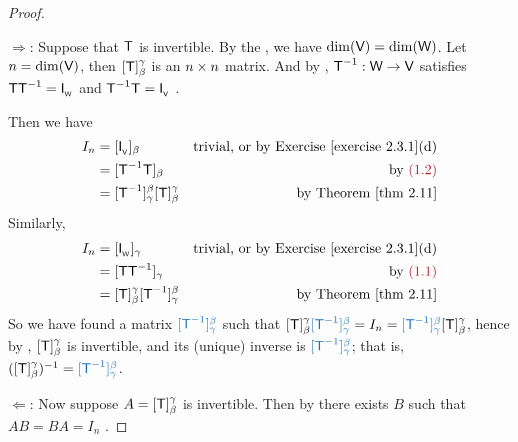 \begin{proof} \ 

\(\Longrightarrow\): Suppose that \(\textsf{T}\) is invertible.
By the , we have \(\dim(\textsf{V}) = \dim(\textsf{W})\).
Let \(n = \dim(\textsf{V})\), then \([\textsf{T}]_{\beta}^{\gamma}\) is an \(n \times n\) matrix.
And by , \(\textsf{T}^{-1} : \textsf{W} \to \textsf{V}\) satisfies \(\textsf{T}\textsf{T}^{-1} = \textsf{I}_{_{\textsf{W}}}\)  and \(\textsf{T}^{-1}\textsf{T} = \textsf{I}_{_{\textsf{V}}}\) .

Then we have
\begin{align*}
    I_n & = [\ITRANV]_{\beta} & \text{trivial, or by \EXEC{2.3.1}(d)} \\
        & = [\T^{-1}\T]_{\beta} & \text{by \MAROON{(1.2)}} \\
        & = [\T^{-1}]_{\gamma}^{\beta} [\T]_{\beta}^{\gamma} & \text{by \THM{2.11}}
\end{align*}
Similarly,
\begin{align*}
    I_n & = [\ITRANW]_{\gamma} & \text{trivial, or by \EXEC{2.3.1}(d)} \\
        & = [\T\T^{-1}]_{\gamma} & \text{by \MAROON{(1.1)}} \\
        & = [\T]_{\beta}^{\gamma} [\T^{-1}]_{\gamma}^{\beta} & \text{by \THM{2.11}}
\end{align*}
So we have found a matrix \( \BLUE{[\T^{-1}]_{\gamma}^{\beta}}\) such that \([\T]_{\beta}^{\gamma} \BLUE{[\T^{-1}]_{\gamma}^{\beta}} = I_n = \BLUE{[\T^{-1}]_{\gamma}^{\beta}} [\T]_{\beta}^{\gamma}\),
hence by , \([\textsf{T}]_{\beta}^{\gamma}\) is invertible, and its (unique) inverse is \(\BLUE{[\T^{-1}]_{\gamma}^{\beta}}\);
that is, \(([\T]_{\beta}^{\gamma})^{-1} = \BLUE{[\T^{-1}]_{\gamma}^{\beta}}\).

\(\Longleftarrow\): Now suppose \(A = [\textsf{T}]_{\beta}^{\gamma}\)  is invertible.
Then by  there exists \(B\) such that \(AB = BA = I_n\) .


\end{proof}
